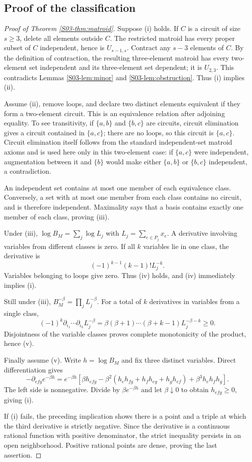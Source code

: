 \documentclass[11pt,a4paper]{article}
\theoremstyle{definition}\newtheorem{definition}[theorem]{Definition}
\theoremstyle{remark}\newtheorem{remark}[theorem]{Remark}
\numberwithin{equation}{section}
\begin{document}
\subsection{Proof of the classification}\label{S03-sec-3}
\begin{proof}[Proof of Theorem \ref{S03-thm:matroid}]
Suppose (i) holds. If $C$ is a circuit of size $s\ge3$, delete all elements outside $C$. The restricted matroid has every proper subset of $C$ independent, hence is $U_{s-1,s}$. Contract any $s-3$ elements of $C$. By the definition of contraction, the resulting three-element matroid has every two-element set independent and its three-element set dependent; it is $U_{2,3}$. This contradicts Lemmas \ref{S03-lem:minor} and \ref{S03-lem:obstruction}. Thus (i) implies (ii).

Assume (ii), remove loops, and declare two distinct elements equivalent if they form a two-element circuit. This is an equivalence relation after adjoining equality. To see transitivity, if $\{a,b\}$ and $\{b,c\}$ are circuits, circuit elimination gives a circuit contained in $\{a,c\}$; there are no loops, so this circuit is $\{a,c\}$. Circuit elimination itself follows from the standard independent-set matroid axioms and is used here only in this two-element case: if $\{a,c\}$ were independent, augmentation between it and $\{b\}$ would make either $\{a,b\}$ or $\{b,c\}$ independent, a contradiction.

An independent set contains at most one member of each equivalence class. Conversely, a set with at most one member from each class contains no circuit, and is therefore independent. Maximality says that a basis contains exactly one member of each class, proving (iii).

Under (iii), $\log B_M=\sum_j\log L_j$ with $L_j=\sum_{e\in P_j}x_e$. A derivative involving variables from different classes is zero. If all $k$ variables lie in one class, the derivative is
\[
 (-1)^{k-1}(k-1)!L_j^{-k}.
\]
Variables belonging to loops give zero. Thus (iv) holds, and (iv) immediately implies (i).

Still under (iii), $B_M^{-\beta}=\prod_jL_j^{-\beta}$. For a total of $k$ derivatives in variables from a single class,
\[
 (-1)^k\partial_{i_1}\cdots\partial_{i_k}L_j^{-\beta}
 =\beta(\beta+1)\cdots(\beta+k-1)L_j^{-\beta-k}\ge0.
\]
Disjointness of the variable classes proves complete monotonicity of the product, hence (v).

Finally assume (v). Write $h=\log B_M$ and fix three distinct variables. Direct differentiation gives
\[
 -\partial_{efg}e^{-\beta h}
 =e^{-\beta h}\left[
 \beta h_{efg}-\beta^2(h_eh_{fg}+h_fh_{eg}+h_gh_{ef})
 +\beta^3h_eh_fh_g\right].
\]
The left side is nonnegative. Divide by $\beta e^{-\beta h}$ and let $\beta\downarrow0$ to obtain $h_{efg}\ge0$, giving (i).

If (i) fails, the preceding implication shows there is a point and a triple at which the third derivative is strictly negative. Since the derivative is a continuous rational function with positive denominator, the strict inequality persists in an open neighborhood. Positive rational points are dense, proving the last assertion.
\end{proof}
\end{document}
